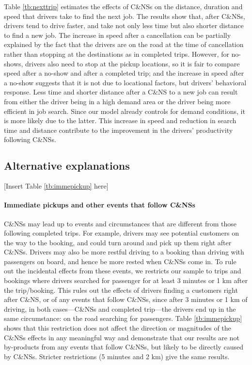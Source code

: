 \documentclass[reviewmode]{restud}
\begin{document}
Table \ref{tb:nexttrip} estimates the effects of C\&NSs on the distance, duration and speed that drivers take to find the next job. The results show that, after C\&NSs, drivers tend to drive faster, and take not only less time but also shorter distance to find a new job. The increase in speed after a cancellation can be partially explained by the fact that the drivers are on the road at the time of cancellation rather than stopping at the destinations as in completed trips. However, for no-shows, drivers also need to stop at the pickup locations, so it is fair to compare speed after a no-show and after a completed trip; and the increase in speed after a no-show suggests that it is not due to locational factors, but drivers' behavioral response. Less time and shorter distance after a C\&NS to a new job can result from either the driver being in a high demand area or the driver being more efficient in job search. Since our model already controls for demand conditions, it is more likely due to the latter. This increase in speed and reduction in search time and distance contribute to the improvement in the drivers' productivity following C\&NSs.

\subsection{Alternative explanations}

\begin{center}
    [Insert Table \ref{tb:immepickup} here]
\end{center}

\paragraph{Immediate pickups and other events that follow C\&NSs} C\&NSs may lead up to events and circumstances that are different from those following completed trips. For example, drivers may see potential customers on the way to the booking, and could turn around and pick up them right after C\&NSs. Drivers may also be more restful driving to a booking than driving with passengers on board, and hence be more rested when C\&NSs come in. To rule out the incidental effects from these events, we restricts our sample to trips and bookings where drivers  searched for passenger for at least 3 minutes or 1 km after the trip/booking. This rules out the effects of drivers finding a customers right after C\&NS, or of any events that follow C\&NSs, since after 3 minutes or 1 km of driving, in both cases---C\&NSs and completed trip---the drivers end up in the same circumstance: on the road searching for passengers. Table \ref{tb:immepickup} shows that this restriction does not affect the direction or magnitudes of the C\&NSs effects in any meaningful way and demonstrate that our results are not by-products from any events that follow C\&NSs, but likely to be directly caused by C\&NSs. Stricter restrictions (5 minutes and 2 km) give the same results.
\end{document}

